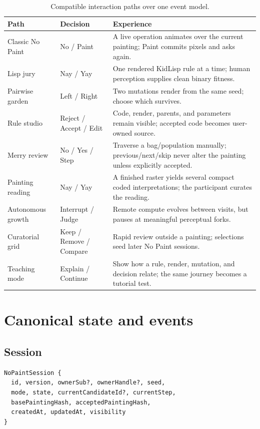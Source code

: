 \documentclass[10pt,letterpaper,twocolumn]{article}
\begin{document}
\begin{table}[t]
\caption{Compatible interaction paths over one event model.}
\begin{tabularx}{\textwidth}{@{}L{1.40in}L{1.15in}Y@{}}
\toprule
\textbf{Path} & \textbf{Decision} & \textbf{Experience} \\
\midrule
Classic No Paint & No / Paint & A live operation animates over the current painting; Paint commits pixels and asks again. \\
Lisp jury & Nay / Yay & One rendered KidLisp rule at a time; human perception supplies clean binary fitness. \\
Pairwise garden & Left / Right & Two mutations render from the same seed; choose which survives. \\
Rule studio & Reject / Accept / Edit & Code, render, parents, and parameters remain visible; accepted code becomes user-owned source. \\
Merry review & No / Yes / Step & Traverse a bag/population manually; previous/next/skip never alter the painting unless explicitly accepted. \\
Painting reading & Nay / Yay & A finished raster yields several compact coded interpretations; the participant curates the reading. \\
Autonomous growth & Interrupt / Judge & Remote compute evolves between visits, but pauses at meaningful perceptual forks. \\
Curatorial grid & Keep / Remove / Compare & Rapid review outside a painting; selections seed later No Paint sessions. \\
Teaching mode & Explain / Continue & Show how a rule, render, mutation, and decision relate; the same journey becomes a tutorial test. \\
\bottomrule
\end{tabularx}
\end{table}

\section{Canonical state and events}

\subsection{Session}

\begin{lstlisting}[basicstyle=\ttfamily\scriptsize,breaklines=true]
NoPaintSession {
  id, version, ownerSub?, ownerHandle?, seed,
  mode, state, currentCandidateId?, currentStep,
  basePaintingHash, acceptedPaintingHash,
  createdAt, updatedAt, visibility
}
\end{lstlisting}
\end{document}
